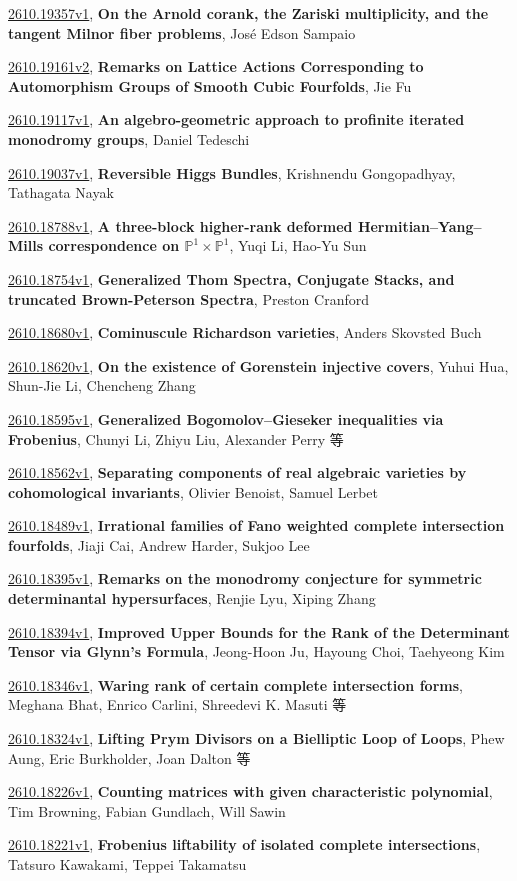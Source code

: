 \documentclass[9pt, a4paper]{article}
\theoremstyle{plain}
\theoremstyle{definition}
\theoremstyle{remark}
\newcommand{\arxiv}[3]{\href{https://arxiv.org/abs/#1}{#1}, \textbf{\textcolor{arxivblue}{#2}}, #3}
\begin{document}
\arxiv{2610.19357v1}{On the Arnold corank, the Zariski multiplicity, and the tangent Milnor fiber problems}{José Edson Sampaio}

\arxiv{2610.19161v2}{Remarks on Lattice Actions Corresponding to Automorphism Groups of Smooth Cubic Fourfolds}{Jie Fu}

\arxiv{2610.19117v1}{An algebro-geometric approach to profinite iterated monodromy groups}{Daniel Tedeschi}

\arxiv{2610.19037v1}{Reversible Higgs Bundles}{Krishnendu Gongopadhyay, Tathagata Nayak}

\arxiv{2610.18788v1}{A three-block higher-rank deformed Hermitian--Yang--Mills correspondence on $\mathbb P^1\times\mathbb P^1$}{Yuqi Li, Hao-Yu Sun}

\arxiv{2610.18754v1}{Generalized Thom Spectra, Conjugate Stacks, and truncated Brown-Peterson Spectra}{Preston Cranford}

\arxiv{2610.18680v1}{Cominuscule Richardson varieties}{Anders Skovsted Buch}

\arxiv{2610.18620v1}{On the existence of Gorenstein injective covers}{Yuhui Hua, Shun-Jie Li, Chencheng Zhang}

\arxiv{2610.18595v1}{Generalized Bogomolov--Gieseker inequalities via Frobenius}{Chunyi Li, Zhiyu Liu, Alexander Perry 等}

\arxiv{2610.18562v1}{Separating components of real algebraic varieties by cohomological invariants}{Olivier Benoist, Samuel Lerbet}

\arxiv{2610.18489v1}{Irrational families of Fano weighted complete intersection fourfolds}{Jiaji Cai, Andrew Harder, Sukjoo Lee}

\arxiv{2610.18395v1}{Remarks on the monodromy conjecture for symmetric determinantal hypersurfaces}{Renjie Lyu, Xiping Zhang}

\arxiv{2610.18394v1}{Improved Upper Bounds for the Rank of the Determinant Tensor via Glynn's Formula}{Jeong-Hoon Ju, Hayoung Choi, Taehyeong Kim}

\arxiv{2610.18346v1}{Waring rank of certain complete intersection forms}{Meghana Bhat, Enrico Carlini, Shreedevi K. Masuti 等}

\arxiv{2610.18324v1}{Lifting Prym Divisors on a Bielliptic Loop of Loops}{Phew Aung, Eric Burkholder, Joan Dalton 等}

\arxiv{2610.18226v1}{Counting matrices with given characteristic polynomial}{Tim Browning, Fabian Gundlach, Will Sawin}

\arxiv{2610.18221v1}{Frobenius liftability of isolated complete intersections}{Tatsuro Kawakami, Teppei Takamatsu}
\end{document}
